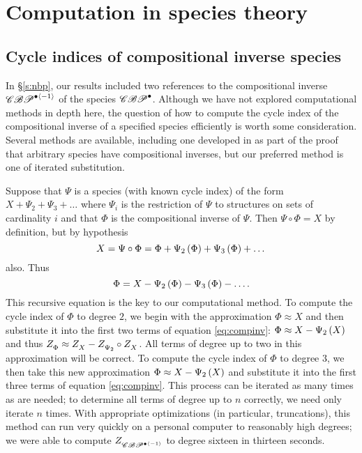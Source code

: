 \documentclass[distribution,draft]{brandiss} %
\numberwithin{section}{chapter}
\numberwithin{figure}{chapter}
\begin{document}
\appendix
\chapter{Computation in species theory}\label{c:comp}
\section{Cycle indices of compositional inverse species}\label{s:compinv}
In \S \ref{s:nbp}, our results included two references to the compositional inverse $\mathscr{CBP}^{\bullet \left\langle {-1} \right\rangle}$ of the species $\mathscr{CBP}^{\bullet}$.
Although we have not explored computational methods in depth here, the question of how to compute the cycle index of the compositional inverse of a specified species efficiently is worth some consideration.
Several methods are available, including one developed in \cite[4.2.19]{bll:species} as part of the proof that arbitrary species have compositional inverses, but our preferred method is one of iterated substitution.

Suppose that $\Psi$ is a species (with known cycle index) of the form $X + \Psi_{2} + \Psi_{3} + \dots$ where $\Psi_{i}$ is the restriction of $\Psi$ to structures on sets of cardinality $i$ and that $\Phi$ is the compositional inverse of $\Psi$.
Then $\Psi \circ \Phi = X$ by definition, but by hypothesis
\begin{equation*}
  X = \Psi \circ \Phi = \Phi + \Psi_{2} \left( {\Phi} \right) + \Psi_{3} \left( {\Phi} \right) + \dots
\end{equation*}
also. Thus
\begin{equation}
  \label{eq:compinv}
  \Phi = X - \Psi_{2} \left( {\Phi} \right) - \Psi_{3} \left( {\Phi} \right) - \dots.
\end{equation}
This recursive equation is the key to our computational method.
To compute the cycle index of $\Phi$ to degree $2$, we begin with the approximation $\Phi \approx X$ and then substitute it into the first two terms of equation \eqref{eq:compinv}: $\Phi \approx X - \Psi_{2} \left( {X} \right)$ and thus $ Z_{\Phi}^{}  \approx  Z_{X}^{}  -  Z_{\Psi_{2}}^{}  \circ  Z_{X}^{} $.
All terms of degree up to two in this approximation will be correct.
To compute the cycle index of $\Phi$ to degree $3$, we then take this new approximation $\Phi \approx X - \Psi_{2} \left( {X} \right)$ and substitute it into the first three terms of equation \eqref{eq:compinv}.
This process can be iterated as many times as are needed; to determine all terms of degree up to $n$ correctly, we need only iterate $n$ times.
With appropriate optimizations (in particular, truncations), this method can run very quickly on a personal computer to reasonably high degrees; we were able to compute $ Z_{\mathscr{CBP}^{\bullet \left\langle {-1} \right\rangle}}^{} $ to degree sixteen in thirteen seconds.
\end{document}
